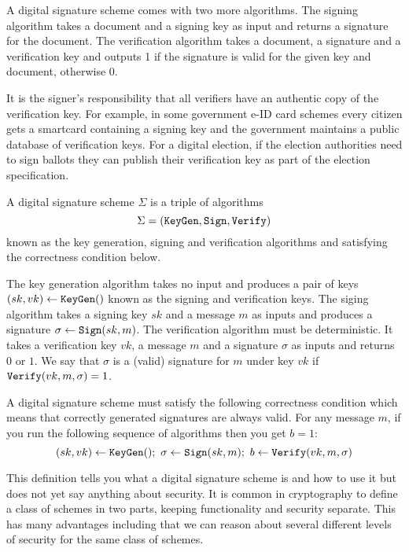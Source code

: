 \documentclass{llncs}
\newcommand{\alg}[1]{\textup{\texttt{#1}}}
\begin{document}
A digital signature scheme comes with two more algorithms. The signing algorithm
takes a document and a signing key as input and returns a signature for the
document. The verification algorithm takes a document, a signature and a
verification key and outputs 1 if the signature is valid for the given key and
document, otherwise 0.

It is the signer's responsibility that all verifiers have an authentic copy of
the verification key. For example, in some government e-ID card schemes every
citizen gets a smartcard containing a signing key and the government maintains a
public database of verification keys. For a digital election, if the election
authorities need to sign ballots they can publish their verification key as part
of the election specification.

\begin{definition}
A digital signature scheme $\Sigma$ is a triple of algorithms
\[
\Sigma = \left( \alg{KeyGen}, \alg{Sign}, \alg{Verify} \right)
\]
known as the key generation, signing and verification algorithms and satisfying
the correctness condition below.

The key generation algorithm takes no input and produces a pair of keys $(sk,
vk) \gets \alg{KeyGen}()$ known as the signing and verification keys. The siging
algorithm takes a signing key $sk$ and a message $m$ as inputs and produces a
signature $\sigma \gets \alg{Sign}(sk, m)$. The verification algorithm must be
deterministic. It takes a verification key $vk$, a message $m$ and a signature
$\sigma$ as inputs and returns $0$ or $1$. We say that $\sigma$ is a (valid)
signature for $m$ under key $vk$ if $\alg{Verify}(vk, m, \sigma) = 1$.

A digital signature scheme must satisfy the following correctness condition
which means that correctly generated signatures are always valid. For any
message $m$, if you run the following sequence of algorithms then you get $b =
1$:
\[
(sk, vk) \gets \alg{KeyGen}();\ \sigma \gets \alg{Sign}(sk, m);\ b \gets \alg{Verify}(vk, m, \sigma)
\]
\end{definition}

This definition tells you what a digital signature scheme is and how to use it
but does not yet say anything about security. It is common in cryptography to
define a class of schemes in two parts, keeping functionality and security
separate. This has many advantages including that we can reason about several
different levels of security for the same class of schemes.
\end{document}
